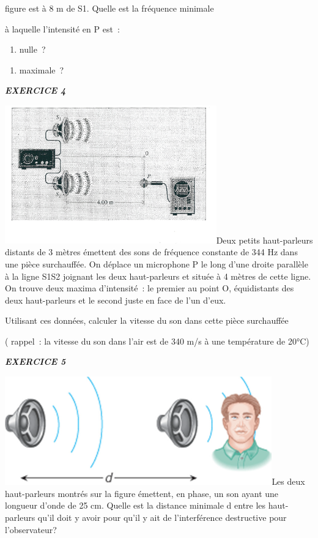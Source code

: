 figure est à 8 m de S1. Quelle est la fréquence minimale

à laquelle l'intensité en P est~:

\begin{enumerate}
\def\labelenumi{\alph{enumi})}
\tightlist
\item
  nulle~?
\end{enumerate}

\begin{enumerate}
\def\labelenumi{\alph{enumi})}
\tightlist
\item
  maximale~?
\end{enumerate}

\emph{\textbf{EXERCICE 4}}

\includegraphics[width=9.146cm,height=5.973cm]{Pictures/100000010000062500000404B4675BF2C4CE1EEC.png}Deux
petits haut-parleurs distants de 3 mètres émettent des sons de fréquence
constante de 344 Hz dans une pièce surchauffée. On déplace un microphone
P le long d'une droite parallèle à la ligne S1S2 joignant les deux
haut-parleurs et située à 4 mètres de cette ligne. On trouve deux maxima
d'intensité~: le premier au point O, équidistants des deux haut-parleurs
et le second juste en face de l'un d'eux.

Utilisant ces données, calculer la vitesse du son dans cette pièce
surchauffée

( rappel~: la vitesse du son dans l'air est de 340 m/s à une température
de 20°C)

\emph{\textbf{EXERCICE 5}}

\includegraphics[width=11.546cm,height=4.688cm]{Pictures/1000000100000363000001603D3E7105AB252F90.png}Les
deux haut-parleurs montrés sur la figure émettent, en phase, un son
ayant une longueur d'onde de 25 cm. Quelle est la distance minimale d
entre les haut-parleurs qu'il doit y avoir pour qu'il y ait de
l'interférence destructive pour l'observateur?

